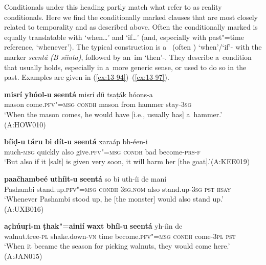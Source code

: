  Conditionals under this heading partly match what \citet[255--256]{thompsonetal2007} refer to as reality conditionals. Here we find the conditionally marked clauses that are most closely related to temporality and  as described above. Often the conditionally marked  is equally translatable with `when{\ldots}' and `if{\ldots}' (and, especially with past"=time reference, `whenever'). The typical construction is a~ (often ) `when'/`if'- with the  marker \textit{seentá (B síinta)}, followed by an~im `then'-. They describe a~condition that usually holds, especially in a~more generic sense, or used to do so in the past. Examples are given in (\ref{ex:13-94})--(\ref{ex:13-97}).

\begin{exe}
\ex
\label{ex:13-94}
\gll \textbf{misrí} \textbf{yhóol-u} \textbf{seentá} misrí díi tsaṭák hóons-a \\
mason come.\textsc{pfv"=msg} \textsc{condh} mason from hammer stay-\textsc{3sg}  \\
\glt `When the mason comes, he would have [i.e., usually has] a~hammer.' (A:HOW010)

\ex
\label{ex:13-95}
\gll \textbf{bíiḍ-u} \textbf{táru} \textbf{bi} \textbf{dít-u} \textbf{seentá} xaraáp  bh-éen-i \\
much-\textsc{msg} quickly also give.\textsc{pfv"=msg} \textsc{condh} bad  become-\textsc{prs-f}   \\
\glt `But also if it [salt] is given very soon, it will harm her [the goat].'\newline (A:KEE019)

\ex
\label{ex:13-96}
\gll \textbf{paačhambeé} \textbf{uthíit-u} \textbf{seentá} so bi  uth-íi de maní \\
Pashambi stand.up.\textsc{pfv"=msg} \textsc{condh} \textsc{3sg.nom} also stand.up-\textsc{3sg} \textsc{pst} \textsc{hsay}  \\
\glt `Whenever Pashambi stood up, he [the monster] would also stand up.' (A:UXB016)

\ex
\label{ex:13-97}
\gll \textbf{ac̣húuṛi-m} \textbf{ṭhak"=ainií} \textbf{waxt} \textbf{bhíl-u} \textbf{seentá}  yh-íin de \\
walnut.tree-\textsc{pl} shake.down-\textsc{vn} time become.\textsc{pfv"=msg} \textsc{condh} come-\textsc{3pl} \textsc{ pst}    \\
\glt `When it became the season for picking walnuts, they would come here.' (A:JAN015) 
\end{exe}

